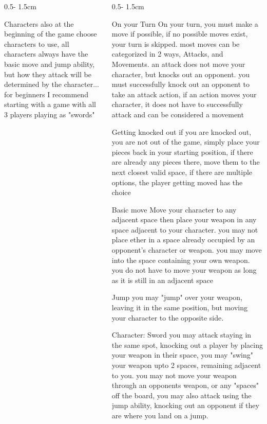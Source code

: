 \documentclass{uioposter}
\begin{document}
\begin{frame}
\begin{columns}[onlytextwidth]
\begin{column}{0.5\textwidth - 1.5cm}
    \begin{block}{Characters}
        also at the beginning of the game choose characters to use, all characters always have the basic move and jump ability, but how they attack will be determined by the character... for beginners I recommend starting with a game with all 3 players playing as "swords"
    \end{block}

\end{column}

\begin{column}{0.5\textwidth - 1.5cm}

    \begin{block}{On your Turn}
        On your turn, you must make a move if possible, if no possible moves exist, your turn is skipped. most moves can be categorized in 2 ways, Attacks, and Movements. an attack does not move your character, but knocks out an opponent. you must successfully knock out an opponent to take an attack action, if an action moves your character, it does not have to successfully attack and can be considered a movement
    \end{block}

    \begin{block}{Getting knocked out}
        if you are knocked out, you are not out of the game, simply place your pieces back in your starting position, if there are already any pieces there, move them to the next closest valid space, if there are multiple options, the player getting moved has the choice
    \end{block}
    
    \begin{block}{Basic move}
        Move your character to any adjacent space
        then place your weapon in any space adjacent to your character.
        you may not place ether in a space already occupied by an opponent's character or weapon.
        you may move into the space containing your own weapon.
        you do not have to move your weapon as long as it is still in an adjacent space
    \end{block}

    \begin{block}{Jump}
        you may "jump" over your weapon, leaving it in the same position, but moving your character to the opposite side.
    \end{block}

    \begin{exampleblock}{Character: Sword}
        you may attack staying in the same spot, knocking out a player by placing your weapon in their space, you may "swing" your weapon upto 2 spaces, remaining adjacent to you. you may not move your weapon through an opponents weapon, or any "spaces" off the board, you may also attack using the jump ability, knocking out an opponent if they are where you land on a jump.
    \end{exampleblock}


\end{column}
\end{columns}
\end{frame}
\end{document}
